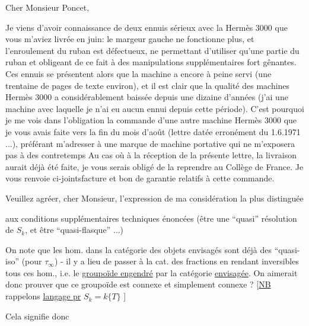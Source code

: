 Cher Monsieur Poncet,

Je viens d'avoir connaissance de deux ennuis sérieux avec la  Hermès 3000 que vous m'aviez livrée en juin: le margeur gauche ne fonctionne plus, et l'enroulement du ruban est défectueux, ne permettant d'utiliser qu'une partie du ruban et obligeant de ce fait à des manipulations supplémentaires fort gênantes. Ces ennuis se présentent alors que la machine a encore à peine servi (une trentaine de pages de texte environ), et il est clair que la qualité des machines Hermès 3000 a considérablement baissée depuis une dizaine d'années (j'ai une machine avec laquelle je n'ai eu aucun ennui depuis cette période). C'est pourquoi je me vois dans l'obligation  la commande d'une autre machine Hermès 3000 que je vous avais faite vers la fin du mois d'août (lettre datée erronément du 1.6.1971 ...), préférant m'adresser à une marque de machine portative qui ne m'exposera pas à des contretemps 
Au cas où à la réception de la présente lettre, la livraison aurait déjà été faite, je vous serais obligé de la reprendre au Collège de France. Je vous renvoie ci-jointsfacture et bon de garantie relatifs à cette commande.

Veuillez agréer, cher Monsieur, l'expression de ma considération la plus distinguée

aux conditions supplémentaires techniques énoncées (être une ``quasi'' résolution de $S_k$, et être ``quasi-flasque'' $\ldots$)

On note que les hom. dans  la catégorie des objets  envisagés sont déjà des ``quasi-iso'' (pour $\tau_\infty$) - il y a lieu de passer à la cat. des fractions en  rendant inversibles tous ces hom., i.e. le \uline{groupoïde engendré} par la catégorie \uline{envisagée}. On aimerait donc prouver que ce groupoïde est connexe et simplement connexe ?
[\uline{NB} rappelons  \uline{langage pr}  $S_k=k\{T\}$ ]

Cela signifie donc

